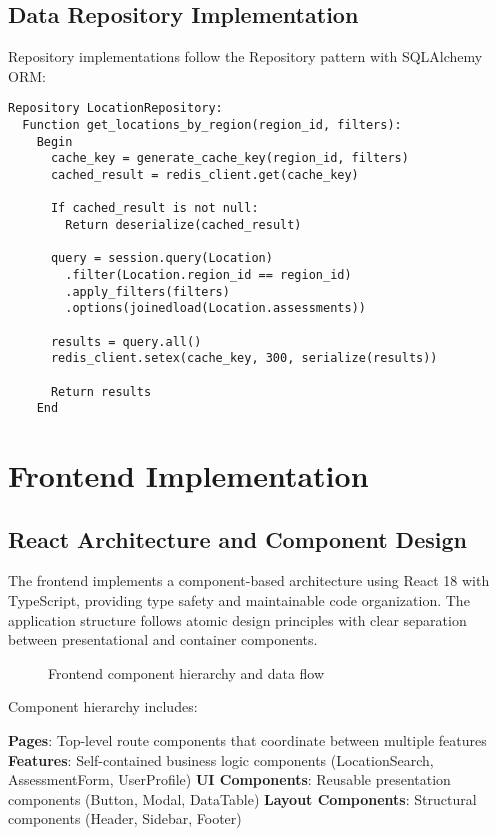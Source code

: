 \documentclass[a4paper,12pt,oneside]{book}
\begin{document}
\section{Data Repository Implementation}

Repository implementations follow the Repository pattern with SQLAlchemy ORM:

\begin{lstlisting}[language=Pseudocode, caption=Repository Implementation with Caching]
Repository LocationRepository:
  Function get_locations_by_region(region_id, filters):
    Begin
      cache_key = generate_cache_key(region_id, filters)
      cached_result = redis_client.get(cache_key)
      
      If cached_result is not null:
        Return deserialize(cached_result)
      
      query = session.query(Location)
        .filter(Location.region_id == region_id)
        .apply_filters(filters)
        .options(joinedload(Location.assessments))
      
      results = query.all()
      redis_client.setex(cache_key, 300, serialize(results))
      
      Return results
    End
\end{lstlisting}

\chapter{Frontend Implementation}
\section{React Architecture and Component Design}

The frontend implements a component-based architecture using React 18 with TypeScript, providing type safety and maintainable code organization. The application structure follows atomic design principles with clear separation between presentational and container components.

\begin{figure}[h]
\centering
{}
\caption{Frontend component hierarchy and data flow}
\label{fig:frontend-architecture}
\end{figure}

Component hierarchy includes:

\textbf{Pages}: Top-level route components that coordinate between multiple features
\textbf{Features}: Self-contained business logic components (LocationSearch, AssessmentForm, UserProfile)
\textbf{UI Components}: Reusable presentation components (Button, Modal, DataTable)
\textbf{Layout Components}: Structural components (Header, Sidebar, Footer)
\end{document}
